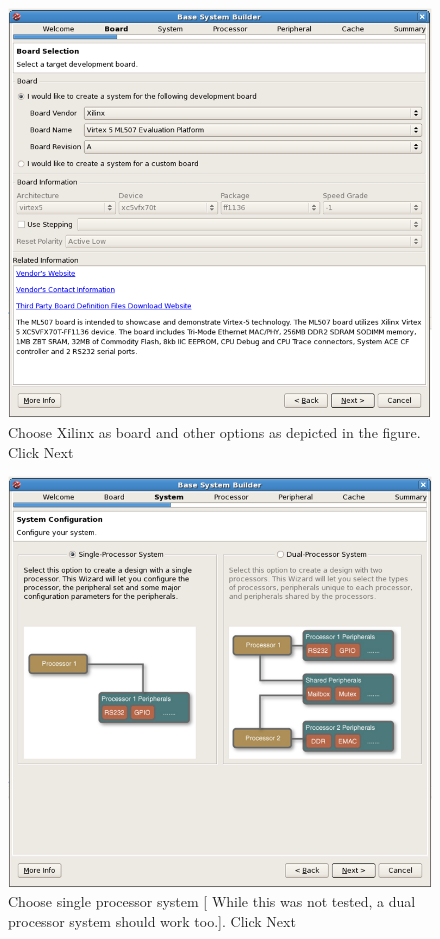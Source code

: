 \documentclass[a4paper,oneside]{memoir}
\begin{document}
\begin{figure}[H]
\centering
\includegraphics[scale=0.4]{step3}
\caption{Choose Xilinx as board and other options as depicted in the figure. Click Next\label{fig:step3}}
\end{figure}
\begin{figure}[H]
\centering
\includegraphics[scale=0.4]{step4}
\caption{Choose single processor system [ While this was not tested, a dual processor system should work too.]. Click Next\label{fig:step4}}
\end{figure}
\end{document}
